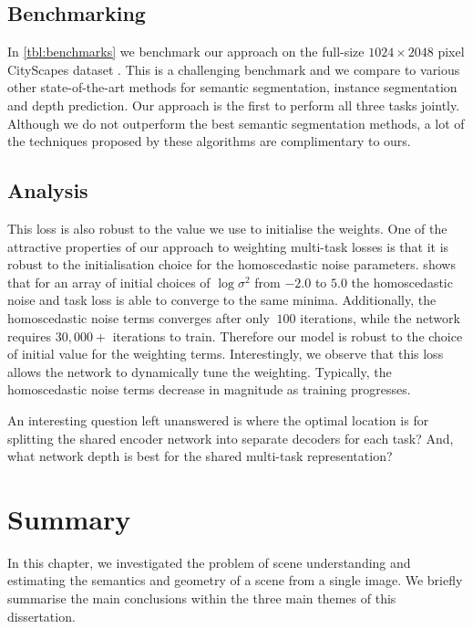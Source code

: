 \subsection{Benchmarking}

In \cref{tbl:benchmarks} we benchmark our approach on the full-size $1024 \times 2048$ pixel CityScapes dataset \citep{Cordts2016Cityscapes}. This is a challenging benchmark and we compare to various other state-of-the-art methods for semantic segmentation, instance segmentation and depth prediction. Our approach is the first to perform all three tasks jointly. Although we do not outperform the best semantic segmentation methods, a lot of the techniques proposed by these algorithms are complimentary to ours.

\subsection{Analysis}

This loss is also robust to the value we use to initialise the weights.
One of the attractive properties of our approach to weighting multi-task losses is that it is robust to the initialisation choice for the homoscedastic noise parameters.  shows that for an array of initial choices of $\log \sigma^2$ from $-2.0$ to $5.0$ the homoscedastic noise and task loss is able to converge to the same minima. Additionally, the homoscedastic noise terms converges after only $~100$ iterations, while the network requires $30,000+$ iterations to train. Therefore our model is robust to the choice of initial value for the weighting terms.
Interestingly, we observe that this loss allows the network to dynamically tune the weighting. Typically, the homoscedastic noise terms decrease in magnitude as training progresses.


An interesting question left unanswered is where the optimal location is for splitting the shared encoder network into separate decoders for each task? And, what network depth is best for the shared multi-task representation?

\section{Summary}

In this chapter, we investigated the problem of scene understanding and estimating the semantics and geometry of a scene from a single image. We briefly summarise the main conclusions within the three main themes of this dissertation.

